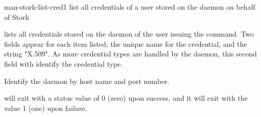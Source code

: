 \begin{ManPage}{}{man-stork-list-cred}{1}
{list all credentials of a user stored on the  daemon on behalf of Stork}

\Synopsis {}
\ToolArgsBase



\Description 

 lists all credentials stored on the  daemon
of the user issuing the  command.
Two fields appear for each item listed:
the unique name for the credential,
and the string "X.509".
As more credential types are handled by the  daemon,
this second field with identify the credential type.


\begin{Options}
  \ToolArgsBaseDesc
    {Identify the  daemon by host name and port number.}
\end{Options}

\ExitStatus

 will exit with a status value of 0 (zero) upon success,
and it will exit with the value 1 (one) upon failure.

\end{ManPage}
